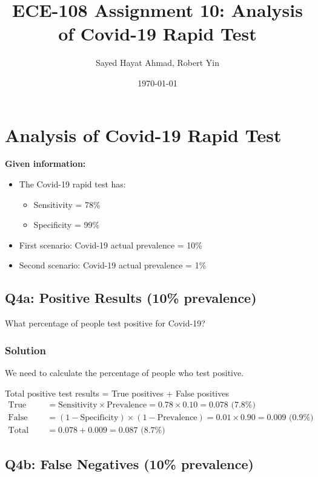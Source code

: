 \documentclass{article}
\title{ECE-108 Assignment 10: Analysis of Covid-19 Rapid Test}
\author{Sayed Hayat Ahmad, Robert Yin}
\date{\today}
\begin{document}
\maketitle

\section{Analysis of Covid-19 Rapid Test}
\textbf{Given information:}
\begin{itemize}
    \item The Covid-19 rapid test has:
    \begin{itemize}
        \item Sensitivity = 78\%
        \item Specificity = 99\%
    \end{itemize}
    \item First scenario: Covid-19 actual prevalence = 10\%
    \item Second scenario: Covid-19 actual prevalence = 1\%
\end{itemize}

\subsection*{Q4a: Positive Results (10\% prevalence)}

What percentage of people test positive for Covid-19?

\subsubsection*{Solution}

We need to calculate the percentage of people who test positive.

Total positive test results = True positives + False positives
\begin{align}
\text{True positives} &= \text{Sensitivity} \times \text{Prevalence} = 0.78 \times 0.10 = 0.078 \text{ (7.8\%)}\\
\text{False positives} &= (1 - \text{Specificity}) \times (1 - \text{Prevalence}) = 0.01 \times 0.90 = 0.009 \text{ (0.9\%)}\\
\text{Total positive tests} &= 0.078 + 0.009 = 0.087 \text{ (8.7\%)}
\end{align}


\subsection*{Q4b: False Negatives (10\% prevalence)}
\end{document}
